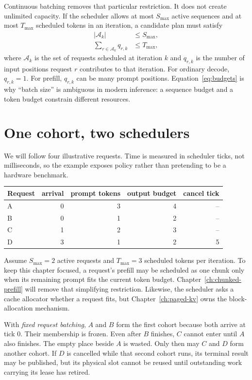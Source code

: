Continuous batching removes that particular restriction. It does not create
unlimited capacity. If the scheduler allows at most $S_{\max}$ active
sequences and at most $T_{\max}$ scheduled tokens in an iteration, a candidate
plan must satisfy
\begin{align}
  |\mathcal A_k| &\le S_{\max},\\
  \sum_{r\in\mathcal A_k} q_{r,k} &\le T_{\max},
  \label{eq:budgets}
\end{align}
where $\mathcal A_k$ is the set of requests scheduled at iteration $k$ and
$q_{r,k}$ is the number of input positions request $r$ contributes to that
iteration. For ordinary decode, $q_{r,k}=1$. For prefill, $q_{r,k}$ can be
many prompt positions. Equation~\eqref{eq:budgets} is why ``batch size'' is
ambiguous in modern inference: a sequence budget and a token budget constrain
different resources.

\section{One cohort, two schedulers}

We will follow four illustrative requests. Time is measured in scheduler
ticks, not milliseconds, so the example exposes policy rather than pretending
to be a hardware benchmark.

\begin{center}
\begin{tabular}{lrrrr}
\toprule
Request & arrival & prompt tokens & output budget & cancel tick\\
\midrule
A & 0 & 3 & 4 & --\\
B & 0 & 1 & 2 & --\\
C & 1 & 2 & 3 & --\\
D & 3 & 1 & 2 & 5\\
\bottomrule
\end{tabular}
\end{center}

Assume $S_{\max}=2$ active requests and $T_{\max}=3$ scheduled tokens per
iteration. To keep this chapter focused, a request's prefill may be scheduled
as one chunk only when its remaining prompt fits the current token budget.
Chapter~\ref{ch:chunked-prefill} will remove that simplifying restriction.
Likewise, the scheduler asks a cache allocator whether a request fits, but
Chapter~\ref{ch:paged-kv} owns the block-allocation mechanism.

With \emph{fixed request batching}, $A$ and $B$ form the first cohort because
both arrive at tick 0. Their membership is frozen. Even after $B$ finishes,
$C$ cannot enter until $A$ also finishes. The empty place beside $A$ is wasted.
Only then may $C$ and $D$ form another cohort. If $D$ is cancelled while that
second cohort runs, its terminal result may be published, but its physical
slot cannot be reused until outstanding work carrying its lease has retired.

